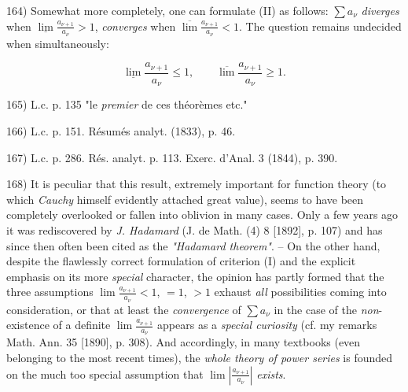 \vfill
\leftline{\rule{2in}{0.4pt}}
\vspace{0.2cm}
{
\footnotesize
164) Somewhat more completely, one can formulate (II) as follows: $\sum a_\nu$ \textit{diverges} when $\underline{\lim} \frac{a_{\nu+1}}{a_\nu} > 1$, \textit{converges} when $\overline{\lim} \frac{a_{\nu+1}}{a_\nu} < 1$. The question remains undecided when simultaneously: 

$$\underline{\lim} \frac{a_{\nu+1}}{a_\nu} \leq 1 , \quad \quad \overline{\lim} \frac{a_{\nu+1}}{a_\nu} \geq 1 .$$

165) L.c. p. 135 "le \textit{premier} de ces théorèmes etc."

166) L.c. p. 151. Résumés analyt. (1833), p. 46.

167) L.c. p. 286. Rés. analyt. p. 113. Exerc. d'Anal. 3 (1844), p. 390.

168) It is peculiar that this result, extremely important for function theory (to which \textit{Cauchy} himself evidently attached great value), seems to have been completely overlooked or fallen into oblivion in many cases. Only a few years ago it was rediscovered by \textit{J. Hadamard} (J. de Math. (4) 8 [1892], p. 107) and has since then often been cited as the \textit{"Hadamard theorem"}. -- On the other hand, despite the flawlessly correct formulation of criterion (I) and the explicit emphasis on its more \textit{special} character, the opinion has partly formed that the three assumptions $\lim \frac{a_{\nu+1}}{a_\nu} < 1$, $= 1$, $> 1$ exhaust \textit{all} possibilities coming into consideration, or that at least the \textit{convergence} of $\sum a_\nu$ in the case of the \textit{non}-existence of a definite $\lim \frac{a_{\nu+1}}{a_\nu}$ appears as a \textit{special curiosity} (cf. my remarks Math. Ann. 35 [1890], p. 308). And accordingly, in many textbooks (even belonging to the most recent times), the \textit{whole theory of power series} is founded on the much too special assumption that $\lim |\frac{a_{\nu+1}}{a_\nu}|$ \textit{exists}.

}